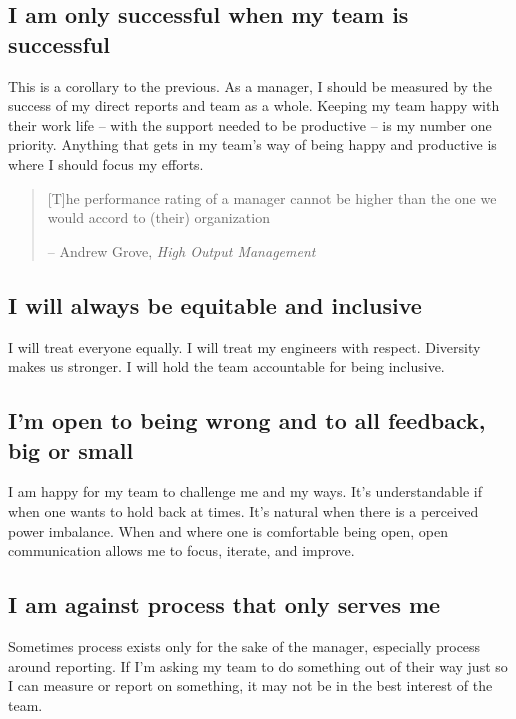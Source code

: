 \documentclass[11pt]{amsart}
\begin{document}
\subsection*{I am only successful when my team is successful}
This is a corollary to the previous. As a manager, I should be measured by the success of my direct reports and team as a whole. Keeping my team  happy with their work life -- with the support needed to be productive -- is my number one priority. Anything that gets in my team's way of being happy and productive is where I should focus my efforts.

\begin{quote}
[T]he performance rating of a manager cannot be higher than the one we would accord to (their) organization

-- Andrew Grove, \emph{High Output Management}
\end{quote}

\subsection*{I will always be equitable and inclusive}
I will treat everyone equally. I will treat my engineers with respect. Diversity makes us stronger. I will hold the team accountable for being inclusive. 

\subsection*{I'm open to being wrong and to all feedback, big or small}
I am happy for my team to challenge me and my ways. It’s understandable if when one wants to hold back at times. It’s natural when there is a perceived power imbalance. When and where one is comfortable being open, open communication allows me to focus, iterate, and improve.

\subsection*{I am against process that only serves me}
Sometimes process exists only for the sake of the manager, especially process around reporting. If I’m asking my team to do something out of their way just so I can measure or report on something, it may not be in the best interest of the team.

\end{document}
